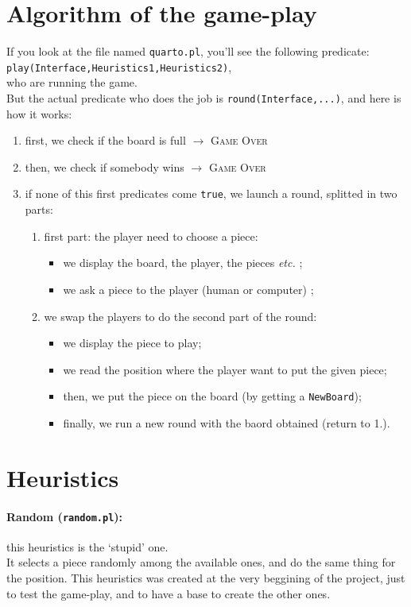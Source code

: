 \documentclass[a4paper,12pt]{article}
\newcommand{\tw}[1]{\texttt{#1}}
\begin{document}
	\section{Algorithm of the game-play}
		If you look at the file named \tw{quarto.pl}, you'll see the following predicate:\\
			\tw{play(Interface,Heuristics1,Heuristics2)},\\
		who are running the game. \\
		But the actual predicate who does the job is \tw{round(Interface,...)}, and here is how it works:
		\begin{enumerate}
			\item first, we check if the board is full $\rightarrow$ \textsc{Game Over}
			\item then, we check if somebody wins $\rightarrow$ \textsc{Game Over}
			\item if none of this first predicates come \tw{true}, we launch a round, splitted in two parts:
			\begin{enumerate}
				\item first part: the player need to choose a piece:
				\begin{itemize}
					\item we display the board, the player, the pieces \textit{etc.} ;
					\item we ask a piece to the player (human or computer) ;
				\end{itemize}
				\item we swap the players to do the second part of the round:
				\begin{itemize}
					\item we display the piece to play;
					\item we read the position where the player want to put the given piece;
					\item then, we put the piece on the board (by getting a \tw{NewBoard});
					\item finally, we run a new round with the baord obtained (return to 1.).
				\end{itemize}
			\end{enumerate}
		\end{enumerate}

	\section{Heuristics}
		\paragraph{Random (\tw{random.pl}):} this heuristics is the `stupid' one. \\
		It selects a piece randomly among the available ones, and do the same thing for the position. This heuristics was created at the very beggining of the project, just to test the game-play, and to have a base to create the other ones.
		
\end{document}
